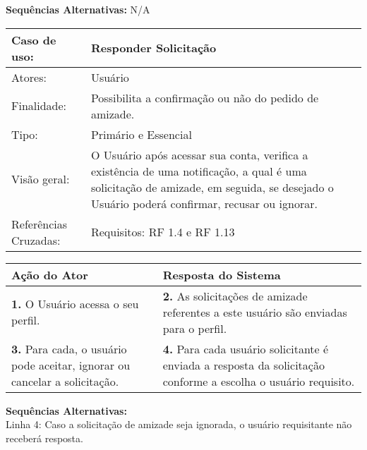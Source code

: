 \documentclass[12pt,a4paper,onecolumn,titlepage]{article}
\begin{document}
\textbf{Sequências Alternativas:} N/A
\newpage


\begin{table}[h!]
\begin{center}
\begin{tabular}{p{2.5cm} p{9.5cm}}
Caso de uso: & \textbf{Responder Solicitação} \\ \hline
Atores: & Usuário \\ \hline
Finalidade: & Possibilita a confirmação ou não do pedido de amizade. \\ \hline
Tipo: & Primário e Essencial\\ \hline
Visão geral: & O Usuário após acessar sua conta, verifica a existência de uma notificação, a qual é uma solicitação de amizade, em seguida, se desejado o Usuário poderá confirmar, recusar ou ignorar.\\ \hline
Referências Cruzadas: & Requisitos: RF 1.4 e RF 1.13 
\end{tabular}
\end{center}
\end{table}


\begin{center}
\def\arraystretch{1.1}
\begin{tabular}{|p{6cm}|p{6cm}|}

\hline
\textbf{Ação do Ator} & \textbf{Resposta do Sistema} \\ \hline
\textbf{1.} O Usuário acessa o seu perfil. & \textbf{2.} As solicitações de amizade referentes a este usuário são enviadas para o perfil. \\ \hline
\textbf{3. } Para cada, o usuário pode aceitar, ignorar ou cancelar a solicitação. & \textbf{4.} Para cada usuário solicitante é enviada a resposta da solicitação conforme a escolha o usuário requisito. \\ \hline
\end{tabular}
\end{center}

\textbf{Sequências Alternativas:}\\
Linha 4: Caso a solicitação de amizade seja ignorada, o usuário requisitante não receberá resposta.

\newpage

\end{document}
